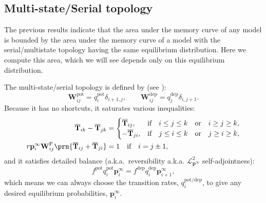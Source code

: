 \documentclass[9pt,twocolumn,twoside,lineno]{pnas-new}
\newcommand{\CL}{\mathcal{L}}
\newcommand{\prob}{\mathbf{p}}
\newcommand{\eq}{\prob^\infty}
\newcommand{\fpt}{\mathbf{T}}
\newcommand{\fptb}{\overline{\fpt}}
\newcommand{\W}{\mathbf{W}}
\newcommand{\frg}{\W^{\mathrm{F}}}
\newcommand{\pot}{^{\text{pot}}}
\newcommand{\dep}{^{\text{dep}}}
\newcommand{\potdep}{^{\text{pot/dep}}}
\begin{document}
\begin{strip}
\subsection{Multi-state/Serial topology}\label{sec:multistate}

The previous results indicate that the area under the memory curve of any model is bounded by the area under the memory curve of a model with the serial/multistate topology having the same equilibrium distribution.
Here we compute this area, which we will see depends only on this equilibrium distribution.

The multi-state/serial topology is defined by (see \cite{amit1994learning,Fusi2007multistate,Leibold2008serial}):
%
\begin{equation}\label{eq:multistatedef}
  \W\pot _{ij} = q\pot _i \delta_{i+1,j},
  \qquad
  \W\dep _{ij} = q\dep _j \delta_{i,j+1}.
\end{equation}
%
Because it has no shortcuts, it saturates various inequalities:
%
\begin{equation}\label{eq:multistateineq}
  \begin{aligned}
    \fptb_{ik} - \fptb_{jk} &=
      \begin{cases}
        \fptb_{ij},  &\text{if}\quad i \leq j \leq k \quad\text{or}\quad i \geq j \geq k,\\
        -\fptb_{ji}, &\text{if}\quad j \leq i \leq k \quad\text{or}\quad j \geq i \geq k,\\
      \end{cases} \\
    r\eq_i \frg_{ij} \prn{\fptb_{ij}+\fptb_{ji}} &= 1 \quad\text{if}\quad i=j\pm1,
  \end{aligned}
\end{equation}
%
and it satisfies detailed balance (a.k.a.\ reversibility a.k.a. $\CL^2_{\eq}$ self-adjointness):
%
\begin{equation}\label{eq:multistateprob}
  f\pot  q\pot _i \eq_i = f\dep  q\dep _i \eq_{i+1},
\end{equation}
%
which means we can always choose the transition rates, $q\potdep _i$, to give any desired equilibrium probabilities, $\eq_i$.



\end{strip}
\end{document}
